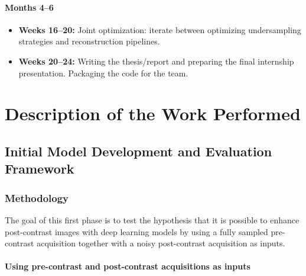 \documentclass[12pt]{article}
\begin{document}
\paragraph{Months 4--6}

\begin{itemize}
    \item \textbf{Weeks 16--20:} Joint optimization: iterate between optimizing undersampling strategies and reconstruction pipelines.
    \item \textbf{Weeks 20--24:} Writing the thesis/report and preparing the final internship presentation. Packaging the code for the team.
\end{itemize}

\section{Description of the Work Performed}

\subsection{Initial Model Development and Evaluation Framework} 

\subsubsection{Methodology}

The goal of this first phase is to test the hypothesis that it is possible to enhance post-contrast images with deep learning models by using a fully sampled pre-contrast acquisition together with a noisy post-contrast acquisition as inputs.

\paragraph{Using pre-contrast and post-contrast acquisitions as inputs}
\mbox{}\\
\end{document}
